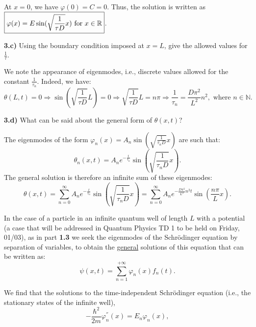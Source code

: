\begin{breakbox}
    \noindent At $x=0$, we have $\varphi(0) = C = 0.$
    Thus, the solution is written as $\boxed{\varphi(x) = E \sin(\sqrt{\frac{1}{\tau D}}x)$ for $x \in \mathbb{R}}$.
\end{breakbox}

\medskip

\noindent \textbf{3.c)} Using the boundary condition imposed at $x=L$, give the allowed values for $\displaystyle \frac{1}{\tau}$.\\

\begin{breakbox}
    \noindent We note the appearance of eigenmodes, i.e., discrete values allowed for the constant $\displaystyle \frac{1}{\tau_n}$.
    Indeed, we have: $$\theta(L,t) = 0 \Rightarrow \sin(\sqrt{\frac{1}{\tau D}}L) = 0 \Rightarrow \sqrt{\frac{1}{\tau D}}L = n\pi \Rightarrow \boxed{\frac{1}{\tau_n} = \frac{D\pi^2}{L^2}n^2, \text{ where } n \in \mathbb{N}.}$$
\end{breakbox}

\medskip

\noindent \textbf{3.d)} What can be said about the general form of $\theta(x,t)$?\\

\begin{breakbox}
    \noindent The eigenmodes of the form $\displaystyle \varphi_n(x) = A_n \sin(\sqrt{\frac{1}{\tau_n D}}x)$ are such that:
    $$\theta_n(x,t) = A_n e^{-\frac{t}{\tau_n}} \sin(\sqrt{\frac{1}{\tau_n D}}x).$$ The general solution is therefore an infinite sum of these eigenmodes:
    $$\boxed{\theta(x,t) = \sum_{n=0}^{\infty} A_n e^{-\frac{t}{\tau_n}} \sin(\sqrt{\frac{1}{\tau_n D}}x) = \sum_{n=0}^{\infty} A_n e^{-\frac{D\pi^2}{L^2}n^2 t} \sin(\frac{n\pi}{L}x).}$$
\end{breakbox}

\medskip

\noindent In the case of a particle in an infinite quantum well of length $L$ with a potential (a case that will be addressed in Quantum Physics TD 1 to be held on Friday, 01/03), as in part \textbf{1.3} we seek the eigenmodes of the Schrödinger equation by separation of variables, to obtain the \underline{general} solutions of this equation that can be written as:
\begin{equation*}
    \psi(x, t) = \sum_{n=1}^{+\infty}\varphi_n(x) f_n(t).
\end{equation*}

\noindent We find that the solutions to the time-independent Schrödinger equation (i.e., the stationary states of the infinite well),
\begin{equation*}
    -\frac{\hbar^2}{2 m} \varphi_n^{''}(x) = E_n \varphi_n(x),
\end{equation*}

